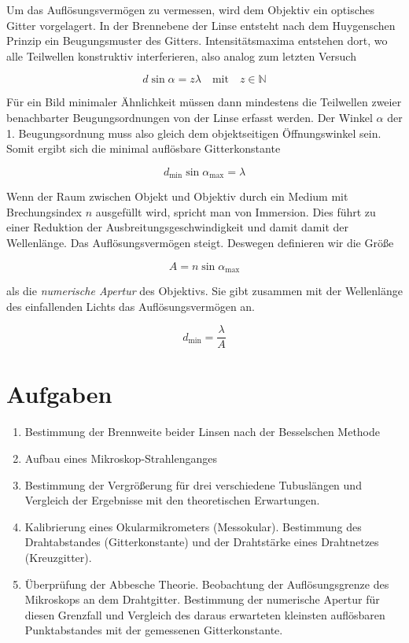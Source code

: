 \documentclass[a4paper,german,12pt,smallheadings]{scrartcl}
\begin{document}
Um das Auflösungsvermögen zu vermessen, wird dem Objektiv ein optisches Gitter
vorgelagert. In der Brennebene der Linse entsteht nach dem Huygenschen Prinzip
ein Beugungsmuster des Gitters. Intensitätsmaxima entstehen dort, wo alle
Teilwellen konstruktiv interferieren, also analog zum letzten Versuch

\begin{equation}
  d \sin \alpha = z \lambda \quad \text{mit} \quad z \in \mathbb{N}
\end{equation}

Für ein Bild minimaler Ähnlichkeit müssen dann mindestens die Teilwellen zweier
benachbarter Beugungsordnungen von der Linse erfasst werden. Der Winkel $\alpha$ der 1.
Beugungsordnung muss also gleich dem objektseitigen Öffnungswinkel sein. Somit
ergibt sich die minimal auflösbare Gitterkonstante

\begin{equation}
  d_\text{min} \sin \alpha_\text{max} = \lambda
  \label{eq:dmin}
\end{equation}

Wenn der Raum zwischen Objekt und Objektiv durch ein Medium mit Brechungsindex
$n$ ausgefüllt wird, spricht man von Immersion. Dies führt zu einer Reduktion
der Ausbreitungsgeschwindigkeit und damit damit der Wellenlänge. Das
Auflösungsvermögen steigt. Deswegen definieren wir die Größe

\begin{equation}
  A = n \sin \alpha_\text{max}
  \label{eq:aper}
\end{equation}

als die \textit{numerische Apertur} des Objektivs. Sie gibt zusammen mit der
Wellenlänge des einfallenden Lichts das Auflösungsvermögen an.

\begin{equation}
  d_\text{min} = \frac{\lambda}{A}
\end{equation}


\section{Aufgaben}
\begin{enumerate}
  \item Bestimmung der Brennweite beider Linsen nach der Besselschen Methode
  \item Aufbau eines Mikroskop-Strahlenganges
  \item Bestimmung der Vergrößerung für drei verschiedene Tubuslängen und
    Vergleich der Ergebnisse mit den theoretischen Erwartungen.
  \item Kalibrierung eines Okularmikrometers (Messokular). Bestimmung des
    Drahtabstandes (Gitterkonstante) und der Drahtstärke eines Drahtnetzes
    (Kreuzgitter).
  \item Überprüfung der Abbesche Theorie. Beobachtung der Auflösungsgrenze des
    Mikroskops an dem Drahtgitter. Bestimmung der numerische Apertur für diesen
    Grenzfall und Vergleich des daraus erwarteten kleinsten auflösbaren
    Punktabstandes mit der gemessenen Gitterkonstante.
\end{enumerate}
\end{document}

